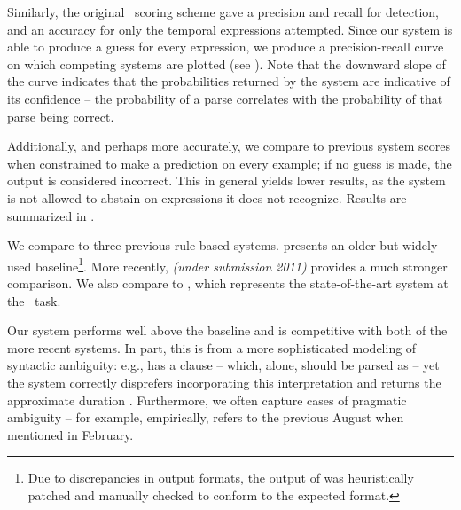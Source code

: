 
Similarly, the original \tempeval\ scoring scheme gave a precision 
	and recall for detection, and an accuracy for only the temporal expressions 
	attempted.
Since our system is able to produce a guess for every expression, we produce
	a precision-recall curve on which competing systems are plotted
	(see ).
Note that the downward slope of the curve indicates that the probabilities
	returned by the system are indicative of its confidence -- the probability
	of a parse correlates with the probability of that parse being correct.

Additionally, and perhaps more accurately, we compare to 
	previous system scores when constrained to make a prediction on every
	example; if no guess is made, the output is considered incorrect.
This in general yields lower results, as the system is not allowed to
	abstain on expressions it does not recognize.
Results are summarized in .

We compare to three previous rule-based systems.
 \cite{key:2000mani-temporal} presents an older but widely
	used baseline\footnote{
		Due to discrepancies in output formats, 
			the output of  was heuristically patched
			and manually checked to conform to the expected format.
	}.
More recently,  \textit{(under submission 2011)} 
	provides a much stronger comparison.
We also compare to  \cite{key:2010strotgen-temporal}, 
	which represents the state-of-the-art system at the \tempeval\ task.

Our system performs well above the  baseline and is competitive
	with both of the more recent systems.
In part, this is from a more sophisticated modeling of syntactic ambiguity:
	e.g.,  has a clause  -- which, alone,
	should be parsed as  -- yet the system correctly disprefers
	incorporating this interpretation and 
	returns the approximate duration .
Furthermore, we often capture cases of pragmatic ambiguity -- for example,
	empirically,  refers to the previous August when mentioned in
	February.



